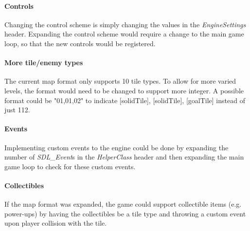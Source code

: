 \paragraph{Controls}
Changing the control scheme is simply changing the values in the \textit{EngineSettings} header. Expanding the control scheme would require a change to the main game loop, so that the new controls would be registered.
\paragraph{More tile/enemy types}
The current map format only supports 10 tile types. To allow for more varied levels, the format would need to be changed to support more integer. A possible format could be "01,01,02" to indicate [solidTile], [solidTile], [goalTile] instead of just 112.
\paragraph{Events}
Implementing custom events to the engine could be done by expanding the number of \textit{SDL\_Event}s in the \textit{HelperClass} header and then expanding the main game loop to check for these custom events.
\paragraph{Collectibles}
If the map format was expanded, the game could support collectible items (e.g. power-ups) by having the collectibles be a tile type and throwing a custom event upon player collision with the tile.